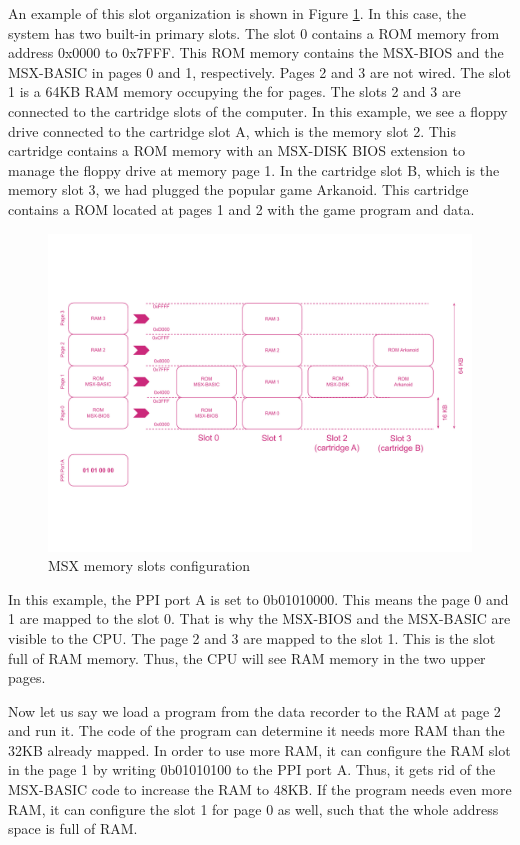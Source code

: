 An example of this slot organization is shown in Figure \ref{fig:msx-mem-slotsprim}. In this case, the system has two built-in primary slots. The slot 0 contains a ROM memory from address 0x0000 to 0x7FFF. This ROM memory contains the MSX-BIOS and the MSX-BASIC in pages 0 and 1, respectively. Pages 2 and 3 are not wired. The slot 1 is a 64KB RAM memory occupying the for pages. The slots 2 and 3 are connected to the cartridge slots of the computer. In this example, we see a floppy drive connected to the cartridge slot A, which is the memory slot 2. This cartridge contains a ROM memory with an MSX-DISK BIOS extension to manage the floppy drive at memory page 1. In the cartridge slot B, which is the memory slot 3, we had plugged the popular game Arkanoid. This cartridge contains a ROM located at pages 1 and 2 with the game program and data. 

\begin{figure}
	\centering
	\includegraphics[width=1\linewidth,trim={0cm 100 0 80}]{images/figures/msx-mem-slotsprim}
	\caption{MSX memory slots configuration}
	\label{fig:msx-mem-slotsprim}
\end{figure}

In this example, the PPI port A is set to 0b01010000. This means the page 0 and 1 are mapped to the slot 0. That is why the MSX-BIOS and the MSX-BASIC are visible to the CPU. The page 2 and 3 are mapped to the slot 1. This is the slot full of RAM memory. Thus, the CPU will see RAM memory in the two upper pages. 

Now let us say we load a program from the data recorder to the RAM at page 2 and run it. The code of the program can determine it needs more RAM than the 32KB already mapped. In order to use more RAM, it can configure the RAM slot in the page 1 by writing 0b01010100 to the PPI port A. Thus, it gets rid of the MSX-BASIC code to increase the RAM to 48KB. If the program needs even more RAM, it can configure the slot 1 for page 0 as well, such that the whole address space is full of RAM. 

